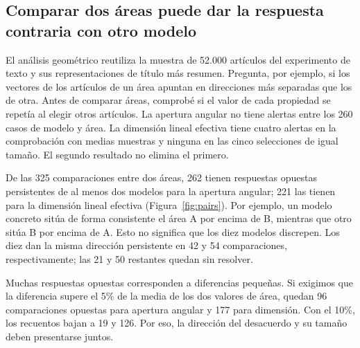 \subsection{Comparar dos áreas puede dar la respuesta contraria con otro modelo}
El análisis geométrico reutiliza la muestra de 52.000 artículos del experimento de texto y sus representaciones de título más resumen. Pregunta, por ejemplo, si los vectores de los artículos de un área apuntan en direcciones más separadas que los de otra. Antes de comparar áreas, comprobé si el valor de cada propiedad se repetía al elegir otros artículos. La apertura angular no tiene alertas entre los 260 casos de modelo y área. La dimensión lineal efectiva tiene cuatro alertas en la comprobación con medias muestras y ninguna en las cinco selecciones de igual tamaño. El segundo resultado no elimina el primero.

De las 325 comparaciones entre dos áreas, 262 tienen respuestas opuestas persistentes de al menos dos modelos para la apertura angular; 221 las tienen para la dimensión lineal efectiva (Figura~\ref{fig:pairs}). Por ejemplo, un modelo concreto sitúa de forma consistente el área A por encima de B, mientras que otro sitúa B por encima de A. Esto no significa que los diez modelos discrepen. Los diez dan la misma dirección persistente en 42 y 54 comparaciones, respectivamente; las 21 y 50 restantes quedan sin resolver.

Muchas respuestas opuestas corresponden a diferencias pequeñas. Si exigimos que la diferencia supere el 5\% de la media de los dos valores de área, quedan 96 comparaciones opuestas para apertura angular y 177 para dimensión. Con el 10\%, los recuentos bajan a 19 y 126. Por eso, la dirección del desacuerdo y su tamaño deben presentarse juntos.

